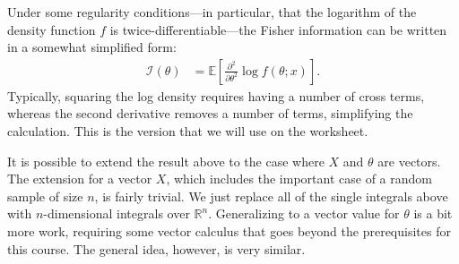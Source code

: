 \documentclass{tufte-handout}
\begin{document}
Under some regularity conditions---in particular, that the logarithm of the
density function $f$ is twice-differentiable---the Fisher information can be
written in a somewhat simplified form:
\begin{align*}
\mathcal{I}(\theta) &= \mathbb{E} \left[ \frac{\partial^2}{\partial \theta^2} \log f(\theta; x) \right].
\end{align*}
Typically, squaring the log density requires having a number of cross terms,
whereas the second derivative removes a number of terms, simplifying the 
calculation. This is the version that we will use on the worksheet.

\vspace*{18pt}

\noindent
It is possible to extend the result above to the case where $X$ and $\theta$
are vectors. The extension for a vector $X$, which includes the important case
of a random sample of size $n$, is fairly trivial. We just replace all of the
single integrals above with $n$-dimensional integrals over $\mathbb{R}^n$. 
Generalizing to a vector value for $\theta$ is a bit more work, requiring 
some vector calculus that goes beyond the prerequisites for this course. 
The general idea, however, is very similar.
\end{document}
